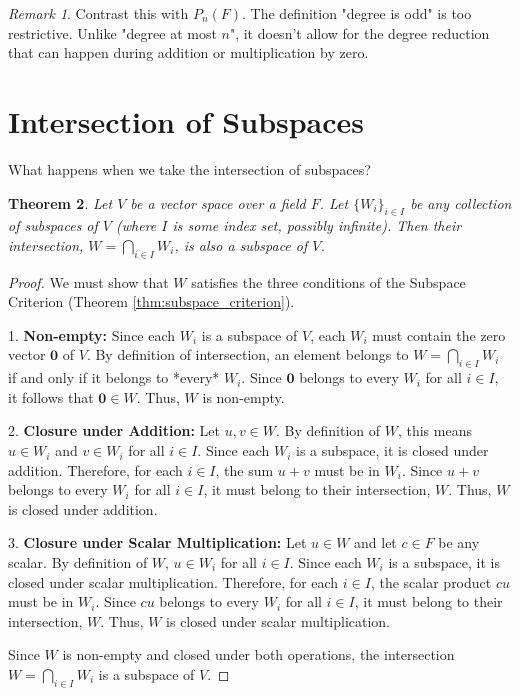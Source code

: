 \documentclass[11pt]{article}
\newtheorem{theorem}{Theorem}[section]
\theoremstyle{definition}
\theoremstyle{remark}
\newtheorem{remark}[theorem]{Remark}
\newcommand{\zerovec}{\mathbf{0}}
\begin{document}
\begin{remark}
Contrast this with $P_n(F)$. The definition "degree is odd" is too restrictive. Unlike "degree at most $n$", it doesn't allow for the degree reduction that can happen during addition or multiplication by zero.
\end{remark}

\section{Intersection of Subspaces}

What happens when we take the intersection of subspaces?

\begin{theorem}
Let $V$ be a vector space over a field $F$. Let $\{W_i\}_{i \in I}$ be any collection of subspaces of $V$ (where $I$ is some index set, possibly infinite). Then their intersection, $W = \bigcap_{i \in I} W_i$, is also a subspace of $V$.
\end{theorem}

\begin{proof}
We must show that $W$ satisfies the three conditions of the Subspace Criterion (Theorem \ref{thm:subspace_criterion}).

1.  \textbf{Non-empty:} Since each $W_i$ is a subspace of $V$, each $W_i$ must contain the zero vector $\zerovec$ of $V$. By definition of intersection, an element belongs to $W = \bigcap_{i \in I} W_i$ if and only if it belongs to *every* $W_i$. Since $\zerovec$ belongs to every $W_i$ for all $i \in I$, it follows that $\zerovec \in W$. Thus, $W$ is non-empty.

2.  \textbf{Closure under Addition:} Let $u, v \in W$. By definition of $W$, this means $u \in W_i$ and $v \in W_i$ for all $i \in I$. Since each $W_i$ is a subspace, it is closed under addition. Therefore, for each $i \in I$, the sum $u+v$ must be in $W_i$. Since $u+v$ belongs to every $W_i$ for all $i \in I$, it must belong to their intersection, $W$. Thus, $W$ is closed under addition.

3.  \textbf{Closure under Scalar Multiplication:} Let $u \in W$ and let $c \in F$ be any scalar. By definition of $W$, $u \in W_i$ for all $i \in I$. Since each $W_i$ is a subspace, it is closed under scalar multiplication. Therefore, for each $i \in I$, the scalar product $cu$ must be in $W_i$. Since $cu$ belongs to every $W_i$ for all $i \in I$, it must belong to their intersection, $W$. Thus, $W$ is closed under scalar multiplication.

Since $W$ is non-empty and closed under both operations, the intersection $W = \bigcap_{i \in I} W_i$ is a subspace of $V$.
\end{proof}
\end{document}
